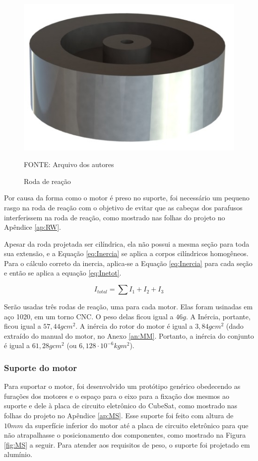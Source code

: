 \documentclass[
	12pt,				%
	openany,			%
	twoside,			%
	a4paper,			%
	english,			%
	french,				%
	spanish,			%
	brazil,				%
	oldfontcommands
	]{abntex2}
\begin{document}
\begin{figure}[th]
	\caption{Roda de reação}
	\centering
	\includegraphics[width=0.5\linewidth]{./figs/Reaction_Wheel}
	
	\begin{small}
		FONTE: Arquivo dos autores
	\end{small}
	\label{fig:RW}
\end{figure}

Por causa da forma como o motor é preso no suporte, foi necessário um pequeno rasgo na roda de reação com o objetivo de evitar que as cabeças dos parafusos interferissem na roda de reação, como mostrado nas folhas do projeto no Apêndice \ref{ap:RW}.

Apesar da roda projetada ser cilíndrica, ela não possui a mesma seção para toda sua extensão, e a Equação \ref{eq:Inercia} se aplica a corpos cilíndricos homogêneos. Para o cálculo correto da inercia, aplica-se a Equação \ref{eq:Inercia} para cada seção e então se aplica a equação \ref{eq:Inetot}.

\begin{equation}
I_{total} = \sum\nolimits I_{1} + I_{2} + I_{3}
\label{eq:Inetot}
\end{equation}

Serão usadas três rodas de reação, uma para cada motor. Elas foram usinadas em aço 1020, em um torno CNC. O peso delas ficou igual a $46g$. A Inércia, portante, ficou igual a $57,44gcm^{2}$. A inércia do rotor do motor é igual a $3,84gcm^{2}$ (dado extraído do manual do motor, no Anexo \ref{an:MM}. Portanto, a inércia do conjunto é igual a $61,28gcm^{2}$ (ou $6,128 \cdot 10^{-6}kgm^{2}$).

\subsubsection{Suporte do motor}

Para suportar o motor, foi desenvolvido um protótipo genérico obedecendo as furações dos motores e o espaço para o eixo para a fixação dos mesmos ao suporte e dele à placa de circuito eletrônico do CubeSat, como mostrado nas folhas do projeto no Apêndice \ref{ap:MS}. Esse suporte foi feito com altura de $10mm$ da superfície inferior do motor até a placa de circuito eletrônico para que não atrapalhasse o posicionamento dos componentes, como mostrado na Figura \ref{fig:MS} a seguir. Para atender aos requisitos de peso, o suporte foi projetado em alumínio.
\end{document}

